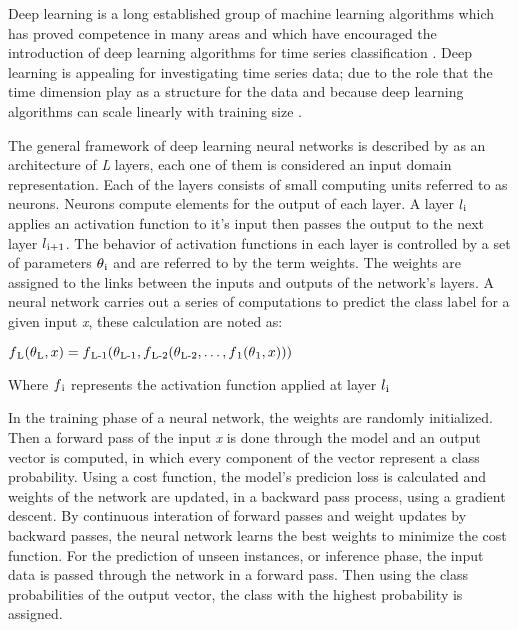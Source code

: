 Deep learning is a long established group of machine learning algorithms which has proved competence in many areas \cite{lecun2015deep}
and which have encouraged the introduction of deep learning algorithms for time series classification \cite{wang2017time}.
Deep learning is appealing for investigating time series data; due to the role that the time dimension play as a structure for the data
and because deep learning algorithms can scale linearly with training size \cite{shifaz2020ts}.

The general framework of deep learning neural networks is described by \cite{fawaz2019deepreview} as an architecture of \emph{L} layers, each one of them is considered an input domain representation.
Each of the layers consists of small computing units referred to as neurons. Neurons compute elements for the output of each layer.
A layer $l\textsubscript{i}$ applies an activation function to it's input then passes the output to the next layer $l\textsubscript{i+1}$.
The behavior of activation functions in each layer is controlled by a set of parameters $\theta\textsubscript{i}$ and are referred to by the term weights.
The weights are assigned to the links between the inputs and outputs of the network's layers. A neural network carries out a series of computations to predict the class label for a given input \emph{x},
these calculation are noted as:
\begin{definition}
    $f\textsubscript{L}(\theta\textsubscript{L},x) = f\textsubscript{L-1}(\theta\textsubscript{L-1},f\textsubscript{L-2}(\theta\textsubscript{L-2},\ldots,f\textsubscript{1}(\theta\textsubscript{1},x)))$

    Where $f\textsubscript{i}$ represents the activation function applied at layer $l\textsubscript{i}$
\end{definition}
In the training phase of a neural network, the weights are randomly initialized. Then a forward pass of the input \emph{x} is done through the model and an output vector is computed,
in which every component of the vector represent a class probability. Using a cost function, the model's predicion loss is calculated
and weights of the network are updated, in a backward pass process, using a gradient descent.
By continuous interation of forward passes and weight updates by backward passes, the neural network learns the best weights to minimize the cost function.
For the prediction of unseen instances, or inference phase, the input data is passed through the network in a forward pass.
Then using the class probabilities of the output vector, the class with the highest probability is assigned.

